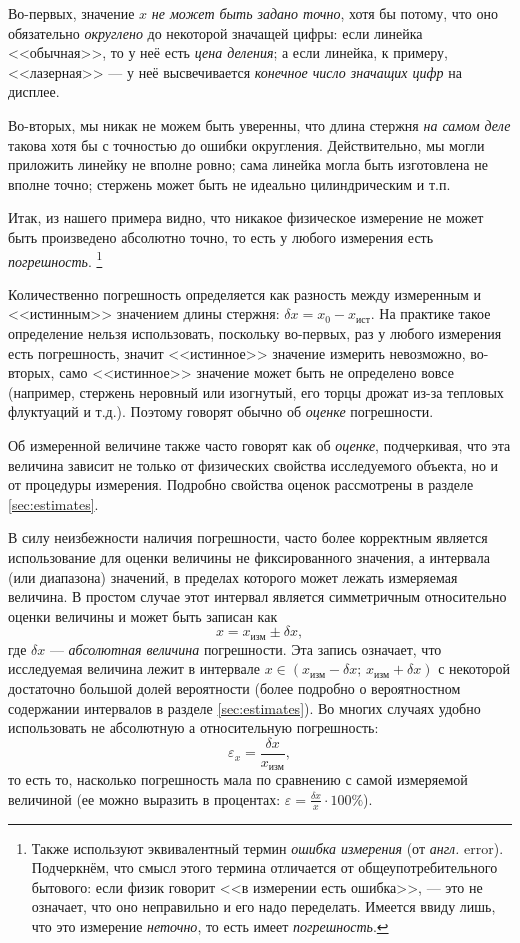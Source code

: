 Во-первых, значение $x$ \emph{не может быть задано точно}, хотя бы
потому, что оно обязательно \emph{округлено} до некоторой значащей
цифры: если линейка <<обычная>>, то у неё
есть \emph{цена деления}; а если линейка, к примеру, <<лазерная>>
--- у неё высвечивается \emph{конечное число значащих цифр}
на дисплее.

Во-вторых, мы никак не можем быть уверенны, что длина стержня \emph{на
самом деле} такова хотя бы с точностью до ошибки округления. Действительно,
мы могли приложить линейку не вполне ровно; сама линейка могла быть
изготовлена не вполне точно; стержень может быть не идеально цилиндрическим
и т.п.

Итак, из нашего примера видно, что никакое физическое измерение не может быть
произведено абсолютно точно, то есть у любого измерения есть \emph{погрешность}.
\footnote{Также используют эквивалентный термин \emph{ошибка измерения}
(от\emph{
англ.} error). Подчеркнём, что смысл этого термина отличается от
общеупотребительного
бытового: если физик говорит <<в измерении есть ошибка>>,
--- это не означает, что оно неправильно и его надо переделать.\emph{
}Имеется ввиду лишь, что это измерение \emph{неточно}, то есть имеет
\emph{погрешность}. }

Количественно погрешность определяется как разность между измеренным и
<<истинным>> значением длины стержня: $\delta x=x_{0}-x_{\text{ист}}$. На
практике такое определение нельзя использовать, поскольку во-первых, раз у
любого измерения есть погрешность, значит <<истинное>> значение измерить
невозможно, во-вторых, само <<истинное>> значение может быть не определено вовсе
(например, стержень неровный или изогнутый, его торцы дрожат из-за тепловых
флуктуаций и т.д.). Поэтому говорят обычно об \emph{оценке} погрешности.

Об измеренной величине также часто говорят как об \emph{оценке}, подчеркивая,
что эта величина зависит не только от физических свойства исследуемого объекта,
но и от процедуры измерения. Подробно свойства оценок рассмотрены в разделе
\ref{sec:estimates}.

В силу неизбежности наличия погрешности, часто более корректным является
использование для оценки величины не фиксированного значения, а интервала (или
диапазона) значений, в пределах которого может лежать измеряемая величина. В
простом случае этот интервал является симметричным относительно оценки величины
и может быть записан как
\[
x=x_{\text{изм}}\pm\delta x,
\]
где $\delta x$ --- \emph{абсолютная величина} погрешности.
Эта запись означает, что исследуемая величина лежит в интервале
$x\in(x_{\text{изм}}-\delta x;\,x_{\text{изм}}+\delta x)$
с некоторой достаточно большой долей вероятности (более подробно о вероятностном
содержании интервалов в разделе \ref{sec:estimates}). Во многих случаях удобно
использовать не абсолютную а относительную погрешность:
\[
\varepsilon_{x}=\frac{\delta x}{x_{\text{изм}}},
\]
то есть то, насколько погрешность мала по сравнению с самой измеряемой
величиной (ее можно выразить в процентах: $\varepsilon=\frac{\delta
x}{x}\cdot100\%$).

